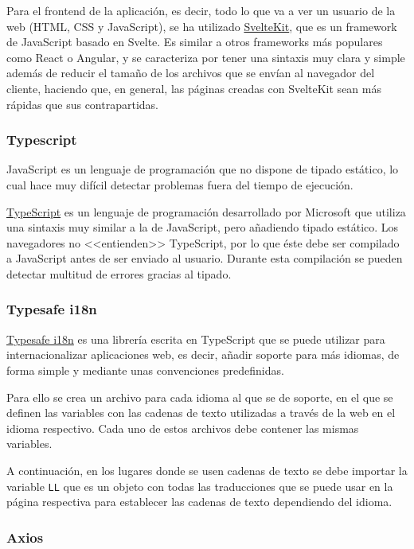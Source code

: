 Para el frontend de la aplicación, es decir, todo lo que va a ver un usuario de
la web (HTML, CSS y JavaScript), se ha utilizado
\href{https://kit.svelte.dev/}{SvelteKit}, que es un framework de JavaScript
basado en Svelte. Es similar a otros frameworks más populares como React o
Angular, y se caracteriza por tener una sintaxis muy clara y simple además de
reducir el tamaño de los archivos que se envían al navegador del cliente,
haciendo que, en general, las páginas creadas con SvelteKit sean más rápidas que
sus contrapartidas.

\subsubsection{Typescript}

JavaScript es un lenguaje de programación que no dispone de tipado estático, lo
cual hace muy difícil detectar problemas fuera del tiempo de ejecución.

\href{https://www.typescriptlang.org/}{TypeScript} es un lenguaje de
programación desarrollado por Microsoft que utiliza una sintaxis muy similar a
la de JavaScript, pero añadiendo tipado estático. Los navegadores no
<<entienden>> TypeScript, por lo que éste debe ser compilado a JavaScript antes
de ser enviado al usuario. Durante esta compilación se pueden detectar multitud
de errores gracias al tipado.

\subsubsection{Typesafe i18n}

\href{https://github.com/ivanhofer/typesafe-i18n}{Typesafe i18n} es una librería
escrita en TypeScript que se puede utilizar para internacionalizar aplicaciones
web, es decir, añadir soporte para más idiomas, de forma simple y mediante unas
convenciones predefinidas.

Para ello se crea un archivo para cada idioma al que se de soporte, en el que se
definen las variables con las cadenas de texto utilizadas a través de la web en
el idioma respectivo. Cada uno de estos archivos debe contener las mismas
variables.

A continuación, en los lugares donde se usen cadenas de texto se debe importar la
variable \texttt{LL} que es un objeto con todas las traducciones que se puede
usar en la página respectiva para establecer las cadenas de texto dependiendo
del idioma.

\subsubsection{Axios}

